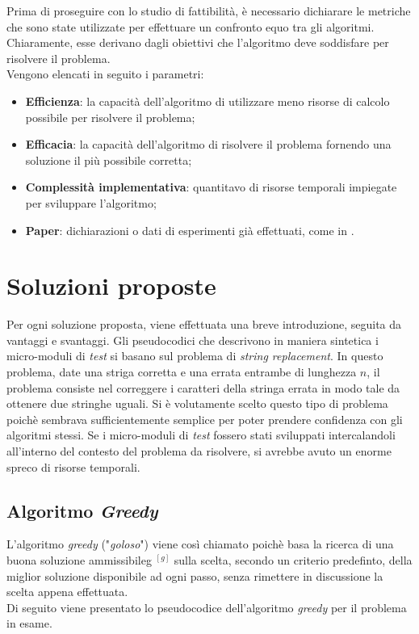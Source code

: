 \noindent Prima di proseguire con lo studio di fattibilità, è necessario dichiarare le metriche che sono state
utilizzate per effettuare un confronto equo tra gli algoritmi. Chiaramente, esse derivano dagli obiettivi che
l'algoritmo deve soddisfare per risolvere il problema.\\
Vengono elencati in seguito i parametri:
\begin{itemize}
    \item \textbf{Efficienza}: la capacità dell'algoritmo di utilizzare meno risorse di calcolo possibile per risolvere il problema;
    \item \textbf{Efficacia}: la capacità dell'algoritmo di risolvere il problema fornendo una soluzione il più possibile corretta;
    \item \textbf{Complessità implementativa}: quantitavo di risorse temporali impiegate per sviluppare l'algoritmo;
    \item \textbf{Paper}: dichiarazioni o dati di esperimenti già effettuati, come in \cite{siteA:paper-chen} \cite{siteR:paper-roli} \cite{siteU:paper-carlos}.
\end{itemize}


\section{Soluzioni proposte}
\noindent Per ogni soluzione proposta, viene effettuata una breve introduzione, seguita da vantaggi e svantaggi.
Gli pseudocodici che descrivono in maniera sintetica i micro-moduli di \textit{test} si basano sul problema di \textit{string replacement}.
In questo problema, date una striga corretta e una errata entrambe di lunghezza $n$, il problema consiste nel correggere i caratteri della stringa errata
in modo tale da ottenere due stringhe uguali.
Si è volutamente scelto questo tipo di problema poichè sembrava sufficientemente semplice per poter prendere confidenza con gli algoritmi stessi.
Se i micro-moduli di \textit{test} fossero stati sviluppati intercalandoli all'interno del contesto del problema da risolvere, si avrebbe avuto un
enorme spreco di risorse temporali.

\subsection{Algoritmo \textit{Greedy}}
\noindent L'algoritmo \textit{greedy} ("\textit{goloso}") \cite{Cormen:algoritmi} viene così chiamato poichè basa la ricerca di una buona
soluzione \gls{ammissibileg} $^{[g]}$ sulla scelta, secondo un criterio predefinto, della miglior soluzione disponibile ad ogni passo, senza
rimettere in discussione la scelta appena effettuata.\\
Di seguito viene presentato lo pseudocodice dell'algoritmo \textit{greedy} per il problema in esame.

